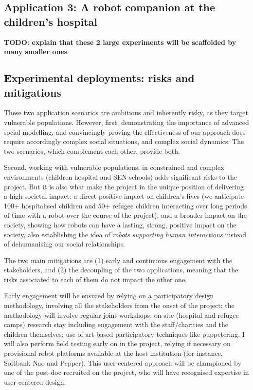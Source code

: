 \documentclass[11pt,a4paper]{report}
\newcommand{\TODO}[1]{{\color{red}\textbf{TODO: #1}}}
\begin{document}
\subsection{Application 3: A robot companion at the children's hospital}


\TODO{explain that these 2 large experiments will be scaffolded by many smaller
ones}

\subsection{Experimental deployments: risks and mitigations}

These two application scenarios are ambitious and inherently risky, as they
target vulnerable populations. However, first, demonstrating the
importance of advanced social modelling, and convincingly proving the
effectiveness of our approach does require accordingly complex social
situations, and complex social dynamics. The two scenarios, which complement
each other, provide both.

Second, working with vulnerable populations, in constrained and complex
environments (children hospital and SEN schools) adds significant risks to the
project. But it is also what make the project in the unique position of
delivering a high societal impact: a direct positive impact on children's
lives (we anticipate 100+ hospitalised children and 50+ refugee children
interacting over long periods of time with a robot over the course of the
project), and a broader impact on the society, showing how robots can have a
lasting, strong, positive impact on the society, also establishing the idea of
\emph{robots supporting human interactions} instead of dehumanising our social
relationships.

The two main mitigations are (1) early and continuous engagement with the
stakeholders, and (2) the decoupling of the two applications, meaning that the
risks associated to each of them do not impact the other one.

Early engagement will be ensured by relying on a participatory design
methodology, involving all the stakeholders from the onset of the project; the
methodology will involve regular joint workshops; on-site (hospital and refugee
camps) research stay including engagement with the staff/charities and the
children themselves; use of art-based participatory techniques like puppetering.
I will also perform field testing early on in the project, relying if necessary
on provisional robot platforms available at the host institution (for instance,
Softbank Nao and Pepper). This user-centered approach will be championed by one
of the post-doc recruited on the project, who will have recognised expertise in
user-centered design.
\end{document}
